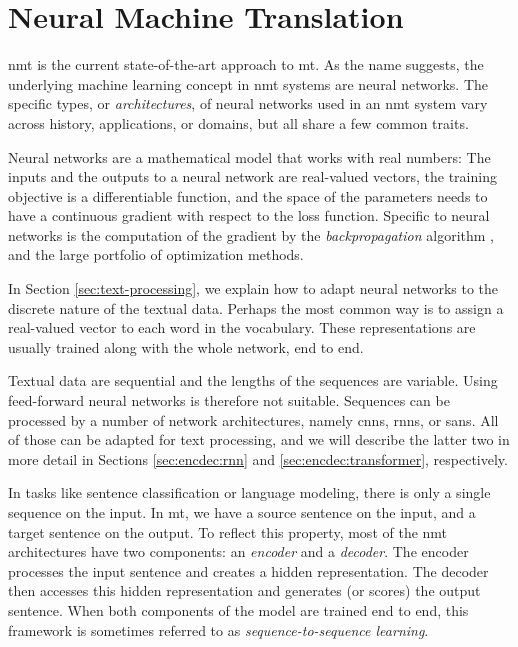 \chapter{Neural Machine Translation}
\label{chap:nmt}



\Gls{nmt} is the current state-of-the-art approach to \gls{mt}. As the name
suggests, the underlying machine learning concept in \gls{nmt} systems are
neural networks. The specific types, or \emph{architectures}, of neural
networks used in an \gls{nmt} system vary across history, applications, or
domains, but all share a few common traits.

Neural networks are a mathematical model that works with real numbers: The
inputs and the outputs to a neural network are real-valued vectors, the
training objective is a differentiable function, and the space of the
parameters needs to have a continuous gradient with respect to the loss
function. Specific to neural networks is the computation of the gradient by the
\emph{backpropagation} algorithm , and the large portfolio of
optimization methods.

In Section \ref{sec:text-processing}, we explain how to adapt neural networks
to the discrete nature of the textual data. Perhaps the most common way is to
assign a real-valued vector to each word in the vocabulary. These
representations are usually trained along with the whole network, end to end.

Textual data are sequential and the lengths of the sequences are
variable. Using feed-forward neural networks is therefore not
suitable. Sequences can be processed by a number of network architectures,
namely \glspl{cnn}, \glspl{rnn}, or \glspl{san}. All of those can be adapted
for text processing, and we will describe the latter two in more detail in
Sections \ref{sec:encdec:rnn} and \ref{sec:encdec:transformer}, respectively.

In  tasks like sentence classification or language modeling,
there is only a single sequence on the input. In \gls{mt}, we have a source
sentence on the input, and a target sentence on the output. To reflect this
property, most of the \gls{nmt} architectures have two components: an
\emph{encoder} and a \emph{decoder}. The encoder processes the input sentence
and creates a hidden representation. The decoder then accesses this hidden
representation and generates (or scores) the output sentence. When both
components of the model are trained end to end, this framework is sometimes
referred to as \emph{sequence-to-sequence learning}. 


